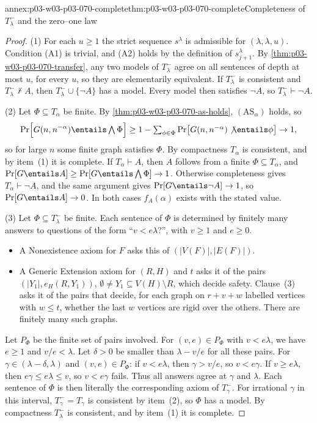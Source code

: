 \begin{annexitem}{annex:p03-w03-p03-070-complete}{thm:p03-w03-p03-070-complete}{Completeness of \(T^-_\lambda\) and the zero--one law}
\begin{proof}
(1) For each \(u\geq1\) the strict sequence \(s^\lambda\) is admissible for
\((\lambda,\lambda,u)\).  Condition (A1) is trivial, and (A2) holds by the
definition of \(s^\lambda_{j+1}\).  By
\cref{thm:p03-w03-p03-070-transfer}, any two models of \(T^-_\lambda\)
agree on all sentences of depth at most \(u\), for every \(u\), so they are
elementarily equivalent.  If \(T^-_\lambda\) is consistent and
\(T^-_\lambda\nvdash A\), then \(T^-_\lambda\cup\{\neg A\}\) has a model.
Every model then satisfies \(\neg A\), so \(T^-_\lambda\vdash\neg A\).

(2) Let \(\Phi\subseteq T_\alpha\) be finite.  By
\cref{thm:p03-w03-p03-070-as-holds}, \((\mathrm{AS}_\alpha)\) holds, so
\[
 \Pr\Bigl[G(n,n^{-\alpha})\entails\textstyle\bigwedge\Phi\Bigr]
 \geq1-\sum_{\phi\in\Phi}\Pr\bigl[G(n,n^{-\alpha})\not\entails\phi\bigr]\to1 ,
\]
so for large \(n\) some finite graph satisfies \(\Phi\).  By compactness
\(T_\alpha\) is consistent, and by item~(1) it is complete.  If
\(T_\alpha\vdash A\), then \(A\) follows from a finite \(\Phi\subseteq T_\alpha\),
and \(\Pr[G\entails A]\geq\Pr[G\entails\bigwedge\Phi]\to1\).  Otherwise
completeness gives \(T_\alpha\vdash\neg A\), and the same argument gives
\(\Pr[G\entails\neg A]\to1\), so \(\Pr[G\entails A]\to0\).  In both cases
\(f_A(\alpha)\) exists with the stated value.

(3) Let \(\Phi\subseteq T^-_\lambda\) be finite.  Each sentence of \(\Phi\)
is determined by finitely many answers to questions of the form
``\(v<e\lambda\)?'', with \(v\geq1\) and \(e\geq0\).
\begin{itemize}
\item A Nonexistence axiom for \(F\) asks this of
      \((|V(F)|,|E(F)|)\).
\item A Generic Extension axiom for \((R,H)\) and \(t\) asks it of the pairs
      \((|Y_1|,e_H(R,Y_1))\), \(\emptyset\neq Y_1\subseteq V(H)\setminus R\),
      which decide safety.  Clause~(3) asks it of the pairs that decide,
      for each graph on \(r+v+w\) labelled vertices with \(w\leq t\), whether
      the last \(w\) vertices are rigid over the others.  There are
      finitely many such graphs.
\end{itemize}
Let \(P_\Phi\) be the finite set of pairs involved.  For \((v,e)\in P_\Phi\)
with \(v<e\lambda\), we have \(e\geq1\) and \(v/e<\lambda\).  Let \(\delta>0\)
be smaller than \(\lambda-v/e\) for all these pairs.  For
\(\gamma\in(\lambda-\delta,\lambda)\) and \((v,e)\in P_\Phi\): if
\(v<e\lambda\), then \(\gamma>v/e\), so \(v<e\gamma\).  If \(v\geq e\lambda\),
then \(e\gamma\leq e\lambda\leq v\), so \(v<e\gamma\) fails.  Thus all
answers agree at \(\gamma\) and \(\lambda\).  Each sentence of \(\Phi\) is then
literally the corresponding axiom of \(T^-_\gamma\).  For irrational
\(\gamma\) in this interval, \(T^-_\gamma=T_\gamma\) is consistent by
item~(2), so \(\Phi\) has a model.  By compactness \(T^-_\lambda\) is
consistent, and by item~(1) it is complete.
\end{proof}
\end{annexitem}

